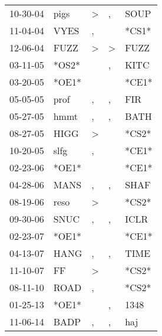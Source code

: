 \begin{supertabular}{lllll}
 10-30-04 &   pigs &  \textgreater &             , &   SOUP \\
 11-04-04 &   VYES &             , &               &  *CS1* \\
 12-06-04 &   FUZZ &  \textgreater &  \textgreater &   FUZZ \\
 03-11-05 &  *OS2* &               &             , &   KITC \\
 03-20-05 &  *OE1* &               &               &  *CE1* \\
 05-05-05 &   prof &             , &             , &    FIR \\
 05-27-05 &   hmmt &             , &             , &   BATH \\
 08-27-05 &   HIGG &  \textgreater &               &  *CS2* \\
 10-20-05 &   slfg &             , &               &  *CE1* \\
 02-23-06 &  *OE1* &               &               &  *CE1* \\
 04-28-06 &   MANS &             , &             , &   SHAF \\
 08-19-06 &   reso &  \textgreater &               &  *CS2* \\
 09-30-06 &   SNUC &             , &             , &   ICLR \\
 02-23-07 &  *OE1* &               &               &  *CE1* \\
 04-13-07 &   HANG &             , &             , &   TIME \\
 11-10-07 &     FF &  \textgreater &               &  *CS2* \\
 08-11-10 &   ROAD &             , &               &  *CS2* \\
 01-25-13 &  *OE1* &               &             , &   1348 \\
 11-06-14 &   BADP &             , &             , &    haj \\
\end{supertabular}
